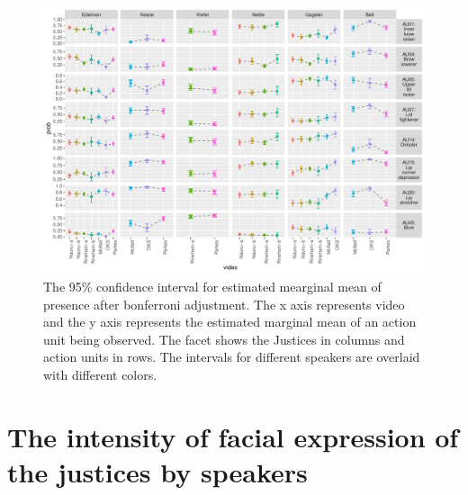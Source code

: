 \documentclass{monashthesis}
\begin{document}
\begin{figure}

{\centering \includegraphics[width=1\linewidth]{figures/model3-plot-1} 

}

\caption{The 95\% confidence interval for estimated mearginal mean of presence after bonferroni adjustment. The x axis represents video and the y axis represents the estimated marginal mean of an action unit being observed. The facet shows the Justices in columns and action units in rows. The intervals for different speakers are overlaid with different colors. }\label{fig:model3-plot}
\end{figure}

\hypertarget{the-intensity-of-facial-expression-of-the-justices-by-speakers}{%
\section{The intensity of facial expression of the justices by speakers}\label{the-intensity-of-facial-expression-of-the-justices-by-speakers}}
\end{document}
